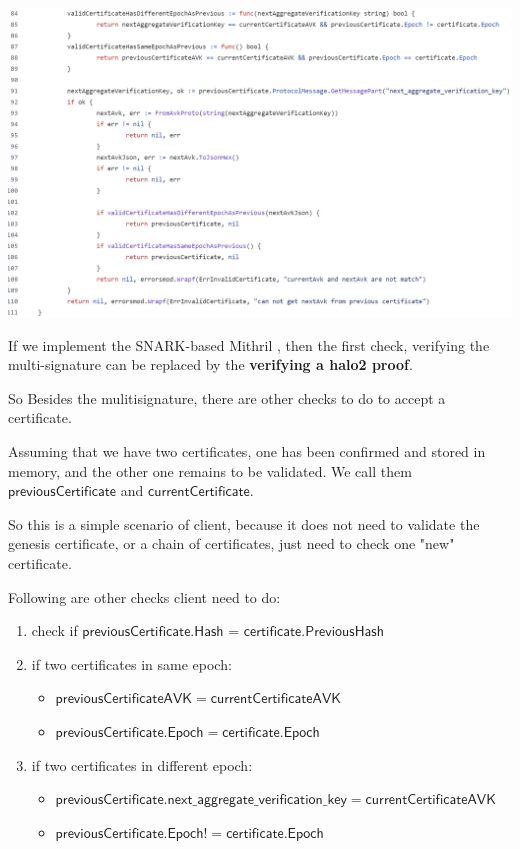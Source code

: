 \documentclass{article}
\begin{document}
\includegraphics[width=1\linewidth]{cardano-ibc-client-mithril-verifycertificate-2.png}

If we implement the SNARK-based Mithril , then the first check, verifying the multi-signature can be replaced by the \textbf{verifying a halo2 proof}.

So Besides the mulitisignature, there are other checks to do to accept a certificate.

Assuming that we have two certificates, one has been confirmed and stored in memory, and the other one remains to be validated. We call them $\mathsf{previousCertificate}$ and $\mathsf{currentCertificate}$.

So this is a simple scenario of client, because it does not need to validate the genesis certificate, or a chain of certificates, just need to check one "new" certificate.

Following are other checks client need to do:

\begin{enumerate}
    \item check if $\mathsf{previousCertificate.Hash}$ = $\mathsf{certificate.PreviousHash}$ 
    \item if two certificates in same epoch:
        \begin{itemize}
            \item $\mathsf{previousCertificateAVK = currentCertificateAVK}$
            \item $\mathsf{previousCertificate.Epoch = certificate.Epoch}$
        \end{itemize}
    \item if two certificates in different epoch:
        \begin{itemize}
            \item $\mathsf{previousCertificate.next\_aggregate\_verification\_key = currentCertificateAVK}$
            \item $\mathsf{previousCertificate.Epoch != certificate.Epoch}$
        \end{itemize}
\end{enumerate}
\end{document}
